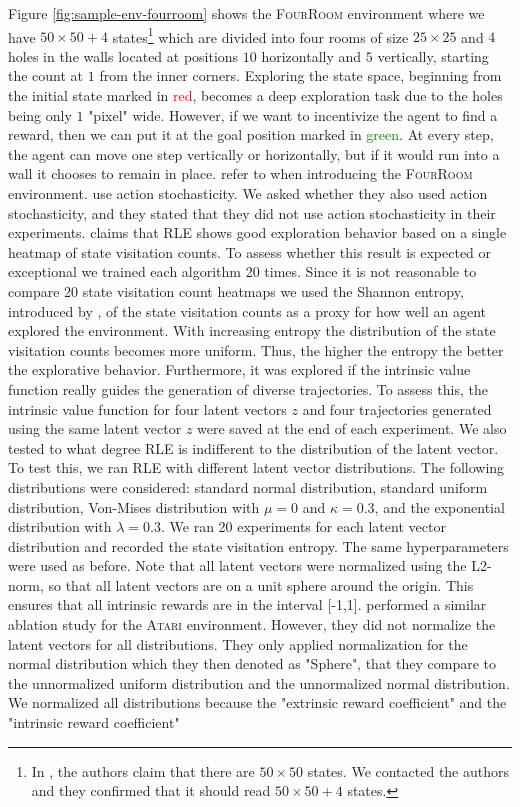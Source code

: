 \documentclass[10pt]{article} %
\begin{document}
\noindent Figure \ref{fig:sample-env-fourroom} shows the \textsc{FourRoom} environment where we have $50\times50 + 4$ states\footnote{In \cite{rle-paper}, the authors claim that there are $50\times 50$ states. We contacted the authors and they confirmed that it should read $50\times 50 + 4$ states.} which are divided into four rooms of size $25\times25$ and $4$ holes in the walls located at positions $10$ horizontally and $5$ vertically, starting the count at $1$ from the inner corners. Exploring the state space, beginning from the initial state marked in \textcolor{red}{red}, becomes a deep exploration task due to the holes being only $1$ "pixel" wide. However, if we want to incentivize the agent to find a reward, then we can put it at the goal position marked in \textcolor{green}{green}. At every step, the agent can move one step vertically or horizontally, but if it would run into a wall it chooses to remain in place. \cite{rle-paper} refer to \cite{grid-world-paper} when introducing the \textsc{FourRoom} environment. \cite{grid-world-paper} use action stochasticity. We asked \cite{rle-paper} whether they also used action stochasticity, and they stated that they did not use action stochasticity in their experiments. \cite{rle-paper} claims that RLE shows good exploration behavior based on a single heatmap of state visitation counts. To assess whether this result is expected or exceptional we trained each algorithm 20 times. Since it is not reasonable to compare 20 state visitation count heatmaps we used the Shannon entropy, introduced by \cite{shannon-entropy-paper}, of the state visitation counts as a proxy for how well an agent explored the environment. With increasing entropy the distribution of the state visitation counts becomes more uniform. Thus, the higher the entropy the better the explorative behavior. Furthermore, it was explored if the intrinsic value function really guides the generation of diverse trajectories. To assess this, the intrinsic value function for four latent vectors $z$ and four trajectories generated using the same latent vector $z$ were saved at the end of each experiment. We also tested to what degree RLE is indifferent to the distribution of the latent vector. To test this, we ran RLE with different latent vector distributions. The following distributions were considered: standard normal distribution, standard uniform distribution, Von-Mises distribution with $\mu=0$ and $\kappa=0.3$, and the exponential distribution with $\lambda=0.3$. We ran 20 experiments for each latent vector distribution and recorded the state visitation entropy. The same hyperparameters were used as before. Note that all latent vectors were normalized using the L2-norm, so that all latent vectors are on a unit sphere around the origin. This ensures that all intrinsic rewards are in the interval [-1,1]. \cite{rle-paper} performed a similar ablation study for the \textsc{Atari} environment. However, they did not normalize the latent vectors for all distributions. They only applied normalization for the normal distribution which they then denoted as "Sphere", that they compare to the unnormalized uniform distribution and the unnormalized normal distribution. We normalized all distributions because the "extrinsic reward coefficient" and the "intrinsic reward coefficient" 
\end{document}
